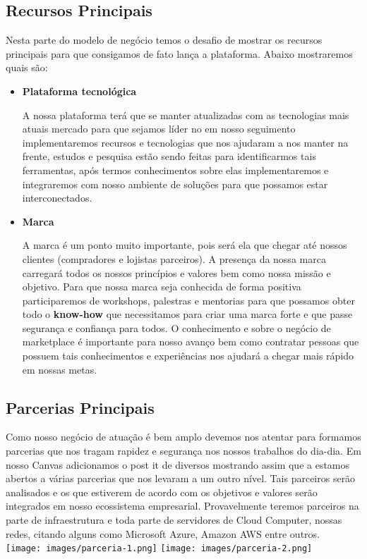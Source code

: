 \documentclass[a4paper]{article}
\begin{document}
\subsection{Recursos Principais}
\par Nesta parte do modelo de negócio temos o desafio de mostrar os recursos principais para que consigamos de fato lança a plataforma. Abaixo mostraremos quais são:
\begin{itemize}
    \item \textbf{Plataforma tecnológica}
    \par A nossa plataforma terá que se manter atualizadas com as tecnologias mais atuais mercado para que sejamos líder no em nosso seguimento implementaremos recursos e tecnologias que nos ajudaram a nos manter na frente, estudos e pesquisa estão sendo feitas para identificarmos tais ferramentas, após termos conhecimentos sobre elas implementaremos e integraremos com nosso ambiente de soluções para que possamos estar interconectados.
    \item \textbf{Marca}
    \par A marca é um ponto muito importante, pois será ela que chegar até nossos clientes (compradores e lojistas parceiros). A presença da nossa marca carregará todos os nossos princípios e valores bem como nossa missão e objetivo. Para que nossa marca seja conhecida de forma positiva participaremos de workshops, palestras e mentorias para que possamos obter todo o \textbf{know-how} que necessitamos para criar uma marca forte e que passe segurança e confiança para todos. O conhecimento e sobre o negócio de marketplace é importante para nosso avanço bem como contratar pessoas que possuem tais conhecimentos e experiências nos ajudará a chegar mais rápido em nossas metas.
\end{itemize}
\subsection{Parcerias Principais}
\par Como nosso negócio de atuação é bem amplo devemos nos atentar para formamos parcerias que nos tragam rapidez e segurança nos nossos trabalhos do dia-dia. Em nosso Canvas adicionamos o post it de diversos mostrando assim que a estamos abertos a várias parcerias que nos levaram a um outro nível. Tais parceiros serão analisados e os que estiverem de acordo com os objetivos e valores serão integrados em nosso ecossistema empresarial. 
Provavelmente teremos parceiros na parte de infraestrutura e toda parte de servidores de Cloud Computer, nossas redes, citando alguns como Microsoft Azure, Amazon AWS entre outros.\\[1cm]
\texttt{[image: images/parceria-1.png]}
\texttt{[image: images/parceria-2.png]}
\end{document}
